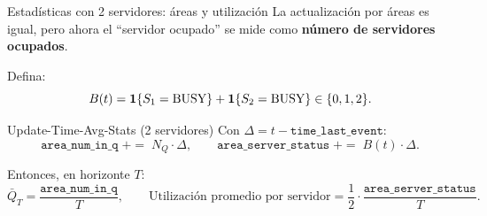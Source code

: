 \documentclass[aspectratio=1610, 9pt]{beamer}
\begin{document}
\begin{frame}{Estadísticas con 2 servidores: áreas y utilización}
\small
La actualización por áreas es igual, pero ahora el “servidor ocupado” se mide como \textbf{número de servidores ocupados}.

\vspace{4pt}
Defina:
\[
B(t)=\mathbf{1}\{S_1=\text{BUSY}\}+\mathbf{1}\{S_2=\text{BUSY}\}\in\{0,1,2\}.
\]

\begin{block}{Update-Time-Avg-Stats (2 servidores)}
Con $\Delta=t-\texttt{time\_last\_event}$:
\[
\texttt{area\_num\_in\_q}\;{+}{=}\;N_Q\cdot \Delta,\qquad
\texttt{area\_server\_status}\;{+}{=}\;B(t)\cdot \Delta.
\]
\end{block}

\vspace{4pt}
Entonces, en horizonte $T$:
\[
\bar Q_T=\frac{\texttt{area\_num\_in\_q}}{T},\qquad
\text{Utilización promedio por servidor}=
\frac{1}{2}\cdot \frac{\texttt{area\_server\_status}}{T}.
\]
\end{frame}

\end{document}
